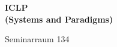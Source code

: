 \documentclass[a4paper]{article}
\begin{document}
\printGenericVSLHeader
\begin{center}
\begin{vsltext}{3cm}{4cm}

   \vspace{0.5cm} 

   \textbf{ICLP}\\
   {\fontsize{2cm}{2cm}\selectfont \textbf{(Systems and Paradigms)}} 

    \vspace{0.5cm}

    Seminarraum 134

\end{vsltext}

\end{center}
\end{document}
